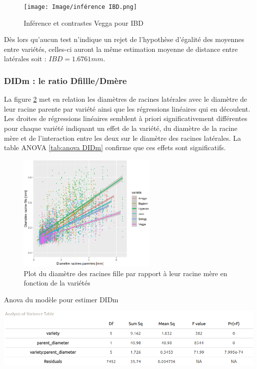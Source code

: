 \begin{figure}[ht]
\centering
\texttt{[image: Image/inférence IBD.png]}
\caption{Inférence et contrastes Vegga pour IBD}
\label{fig:inférence IBD}
\end{figure}

Dès lors qu'aucun test n'indique un rejet de l'hypothèse d'égalité des moyennes entre variétés, celles-ci auront la même estimation moyenne de distance entre latérales soit : $IBD=1.6761 mm$.

\subsubsection{DIDm : le ratio Dfillle/Dmère}

La figure \ref{fig:plot DIDm} met en relation les diamètres de racines latérales avec le diamètre de leur racine parente par variété ainsi que les régressions linéaires qui en découlent.
Les droites de régressions linéaires semblent à priori significativement différentes pour chaque variété indiquant un effet de la variété, du diamètre de la racine mère et de l'interaction entre les deux sur le diamètre des racines latérales.
La table ANOVA \ref{tab:anova DIDm} confirme que ces effets sont significatifs.
\newpage

\begin{figure}[ht]
\centering
\includegraphics[width=0.6\textwidth]{Image/plot DIDm.png}
\caption{Plot du diamètre des racines fille par rapport à leur racine mère en fonction de la variétés }
\label{fig:plot DIDm}
\end{figure}

\begin{table}[ht]
    \centering
    \caption{Anova du modèle pour estimer DIDm}
    \includegraphics[width=1\textwidth]{Image/anova DIDm.png}
    \label{tab:anova DIDm}
\end{table}

